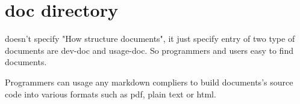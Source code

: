 \section{doc directory}

\begin{crules}
\end{crules}

\pkgname{} doesn't specify "How structure documents", it just specify entry
of two type of documents are \mbox{dev-doc} and \mbox{usage-doc}. So
programmers and users easy to find documents.

Programmers can usage any markdown compliers to build documents's source code 
into various formats such as pdf, plain text or html.
